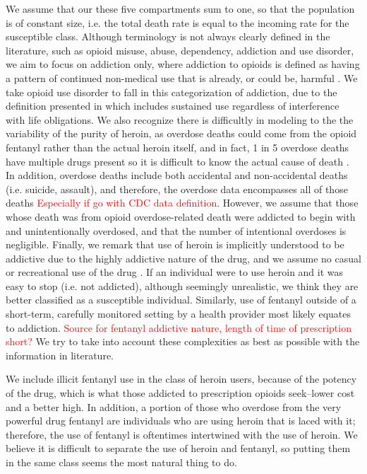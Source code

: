 \documentclass[12pt]{article}
\begin{document}

We assume that our these five compartments sum to one, so that the population is of constant size, i.e. the total death rate is equal to the incoming rate for the susceptible class. Although terminology is not always clearly defined in the literature, such as opioid misuse, abuse, dependency, addiction and use disorder, we aim to focus on addiction only, where addiction to opioids is defined as having a pattern of continued non-medical use that is already, or could be, harmful \cite{Vowles}. We take opioid use disorder to fall in this categorization of addiction, due to the definition presented in \cite{SAMSHA2} which includes sustained use regardless of interference with life obligations. We also recognize there is difficultly in modeling to the the variability of the purity of heroin, as overdose deaths could come from the opioid fentanyl rather than the actual heroin itself, and in fact, 1 in 5 overdose deaths have multiple drugs present so it is difficult to know the actual cause of death \cite{CDC4}. In addition, overdose deaths include both accidental and non-accidental deaths (i.e. suicide, assault), and therefore, the overdose data encompasses all of those deaths \textcolor{red}{Especially if go with CDC data definition}.
However, we assume that those whose death was from opioid overdose-related death were addicted to begin with and unintentionally overdosed, and that the number of intentional overdoses is negligible. Finally, we remark that use of heroin is implicitly understood to be addictive due to the highly addictive nature of the drug, and we assume no casual or recreational use of the drug \cite{NIH1}. If an individual were to use heroin and it was easy to stop (i.e. not addicted), although seemingly unrealistic, we think they are better classified as a susceptible individual. Similarly, use of fentanyl outside of a short-term, carefully monitored setting by a health provider most likely equates to addiction. \textcolor{red}{Source for fentanyl addictive nature, length of time of prescription short?} We try to take into account these complexities as best as possible with the information in literature.

We include illicit fentanyl use in the class of heroin users, because of the potency of the drug, which is what those addicted to prescription opioids seek--lower cost and a better high. In addition, a portion of those who overdose from the very powerful drug fentanyl are individuals who are using heroin that is laced with it; therefore, the use of fentanyl is oftentimes intertwined with the use of heroin. We believe it is difficult to separate the use of heroin and fentanyl, so putting them in the same class seems the most natural thing to do. 
\end{document}
